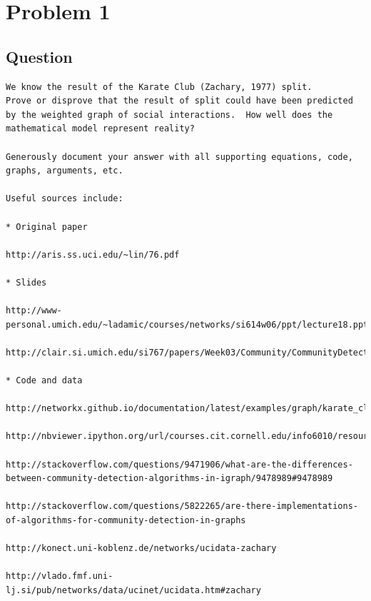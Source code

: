 \section{Problem 1}
\label{part1}
\subsection*{Question}
\begingroup
\begin{verbatim}
We know the result of the Karate Club (Zachary, 1977) split.
Prove or disprove that the result of split could have been predicted
by the weighted graph of social interactions.  How well does the
mathematical model represent reality?

Generously document your answer with all supporting equations, code,
graphs, arguments, etc.

Useful sources include:

* Original paper

http://aris.ss.uci.edu/~lin/76.pdf

* Slides

http://www-personal.umich.edu/~ladamic/courses/networks/si614w06/ppt/lecture18.ppt

http://clair.si.umich.edu/si767/papers/Week03/Community/CommunityDetection.pptx

* Code and data

http://networkx.github.io/documentation/latest/examples/graph/karate_club.html

http://nbviewer.ipython.org/url/courses.cit.cornell.edu/info6010/resources/11notes.ipynb

http://stackoverflow.com/questions/9471906/what-are-the-differences-between-community-detection-algorithms-in-igraph/9478989#9478989

http://stackoverflow.com/questions/5822265/are-there-implementations-of-algorithms-for-community-detection-in-graphs

http://konect.uni-koblenz.de/networks/ucidata-zachary

http://vlado.fmf.uni-lj.si/pub/networks/data/ucinet/ucidata.htm#zachary
\end{verbatim}
\endgroup

\newpage
